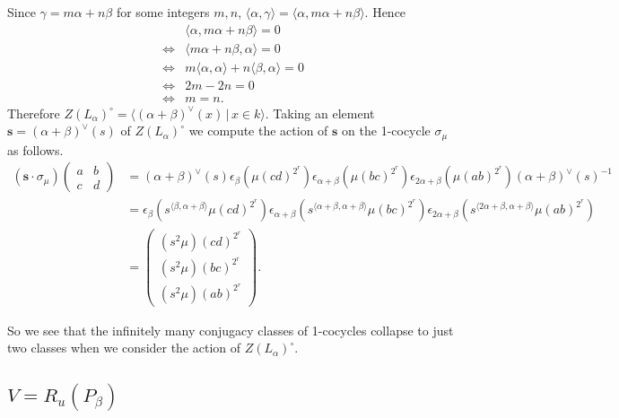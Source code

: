 Since $\gamma = m\alpha + n\beta$ for some integers $m,n$, $\langle \alpha, \gamma \rangle = \langle \alpha, m\alpha + n\beta \rangle$. Hence
\begin{align*}
&\langle \alpha, m\alpha + n\beta \rangle = 0 \\
\Leftrightarrow &\langle m\alpha + n\beta, \alpha \rangle = 0 \\
\Leftrightarrow &m\langle \alpha, \alpha \rangle + n \langle \beta, \alpha\rangle = 0 \\
\Leftrightarrow &2m - 2n = 0 \\
\Leftrightarrow &m = n.
\end{align*}
Therefore $Z(L_ \alpha)^\circ = \langle (\alpha + \beta)^\vee(x)\,|\,x \in k \rangle$. Taking an element $\mathbf{s} = (\alpha + \beta)^\vee(s)$ of $Z(L_\alpha)^\circ$ we compute the action of $\mathbf{s}$ on the 1-cocycle $\sigma_\mu$ as follows.
\begin{align*}
\left(\mathbf{s}\cdot \sigma_\mu\right)
\left(\begin{matrix} a & b \\ c & d\end{matrix} \right) 
&=
(\alpha + \beta)^\vee(s) \epsilon_\beta \left(\mu (cd)^{2^r} \right)\epsilon_{\alpha+\beta} \left(\mu(bc)^{2^r} \right)\epsilon_{2\alpha + \beta} \left(\mu(ab)^{2^r} \right)(\alpha + \beta)^\vee(s)^{-1}\\
&=  \epsilon_\beta\left(s^{\langle\beta , \alpha+\beta\rangle}\mu (cd)^{2^r} \right)\epsilon_{\alpha+\beta} \left(s^{\langle \alpha+\beta, \alpha+\beta \rangle} \mu(bc)^{2^r} \right)\epsilon_{2\alpha + \beta} \left(s^{\langle 2\alpha+\beta, \alpha+\beta\rangle}\mu(ab)^{2^r}\right) \\
&=
\left(\begin{matrix}
(s^2\mu)(cd)^{2^r} \\
(s^2\mu)(bc)^{2^r} \\
(s^2\mu)(ab)^{2^r}
\end{matrix}\right).
\end{align*}

So we see that the infinitely many conjugacy classes of 1-cocycles collapse to just two classes when we consider the action of $Z(L_\alpha)^\circ$.

\subsection{$V = R_u(P_\beta)$}
\label{b2:beta}

